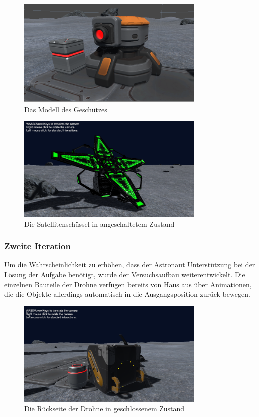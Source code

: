 \begin{figure}[H]
\centering
\includegraphics[width=0.8\textwidth]{Turret.PNG}
\caption{Das Modell des Geschützes}
\end{figure}

\begin{figure}[H]
\centering
\includegraphics[width=0.8\textwidth]{SatelliteDish.PNG}
\caption{Die Satellitenschüssel in angeschaltetem Zustand}
\end{figure}

\subsubsection*{Zweite Iteration}
Um die Wahrscheinlichkeit zu erhöhen, dass der Astronaut Unterstützung bei der Lösung der Aufgabe benötigt, wurde der Versuchsaufbau weiterentwickelt. Die einzelnen Bauteile der Drohne verfügen bereits von Haus aus über Animationen, die die Objekte allerdings automatisch in die Ausgangsposition zurück bewegen. 

\begin{figure}[H]
\centering
\includegraphics[width=0.8\textwidth]{DrohneGeschlossen.PNG}
\caption{Die Rückseite der Drohne in geschlossenem Zustand}
\end{figure}

